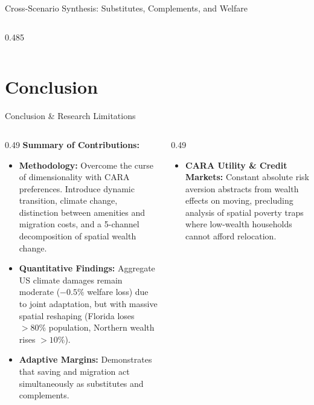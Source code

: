 \documentclass[aspectratio=169, 10pt]{beamer}
\begin{document}
\begin{frame}{Cross-Scenario Synthesis: Substitutes, Complements, and Welfare \hfill \hyperlink{backup:welfare_metric}{\scriptsize{}}}
\begin{columns}[onlytextwidth, T]
\begin{column}{0.485\textwidth}
        \end{column}
    \end{columns}
\end{frame}

\section{Conclusion}

\begin{frame}{Conclusion \& Research Limitations \hfill \hyperlink{backup:toc}{\scriptsize{}}}\label{main:conclusion}
    \begin{columns}[onlytextwidth, T]
        \begin{column}{0.49\textwidth}
            \textbf{Summary of Contributions:}
            \begin{itemize}\footnotesize\setlength{\itemsep}{2pt}
                \item \textbf{Methodology:} Overcome the curse of dimensionality with CARA preferences. Introduce dynamic transition, climate change, distinction between amenities and migration costs, and a 5-channel decomposition of spatial wealth change.
                \item \textbf{Quantitative Findings:} Aggregate US climate damages remain moderate ($-0.5\%$ welfare loss) due to joint adaptation, but with massive spatial reshaping (Florida loses $>80\%$ population, Northern wealth rises $>10\%$).
                \item \textbf{Adaptive Margins:} Demonstrates that saving and migration act simultaneously as substitutes and complements.
            \end{itemize}
        \end{column}
        \begin{column}{0.49\textwidth}
            \begin{tcolorbox}[leafbox, title=Structural Limitations \& Future Research]
                \scriptsize
                \begin{itemize}\setlength{\itemsep}{2pt}
                    \item \textbf{CARA Utility \& Credit Markets:} Constant absolute risk aversion abstracts from wealth effects on moving, precluding analysis of spatial poverty traps where low-wealth households cannot afford relocation.

\end{itemize}
\end{tcolorbox}
\end{column}
\end{columns}
\end{frame}
\end{document}
